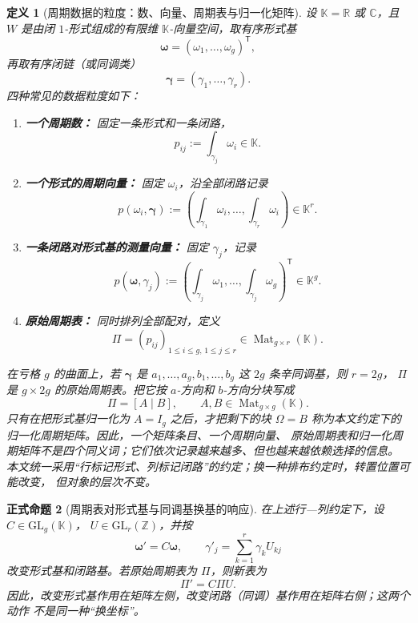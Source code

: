 \documentclass[UTF8,fontset=none,a4paper,11pt]{ctexart}
\theoremstyle{foundation-definition}
\newtheorem{definition}{定义}[section]
\theoremstyle{foundation-theorem}
\theoremstyle{foundation-proposition}
\newtheorem{proposition}[definition]{正式命题}
\theoremstyle{foundation-example}
\theoremstyle{foundation-remark}
\theoremstyle{foundation-theorem}
\begin{document}
\begin{definition}[周期数据的粒度：数、向量、周期表与归一化矩阵]\label{def:period-data-levels}
设 \(\mathbb K=\mathbb R\) 或 \(\mathbb C\)，且 \(W\) 是由闭 \(1\)-形式组成的有限维
\(\mathbb K\)-向量空间，取有序形式基
\[
  \boldsymbol\omega=(\omega_1,\ldots,\omega_g)^{\mathsf T},
\]
再取有序闭链（或同调类）
\[
  \boldsymbol\gamma=(\gamma_1,\ldots,\gamma_r).
\]
四种常见的数据粒度如下：
\begin{enumerate}[label=(\alph*)]
  \item \textbf{一个周期数：} 固定一条形式和一条闭路，
  \[
    p_{ij}:=\int_{\gamma_j}\omega_i\in\mathbb K.
  \]
  \item \textbf{一个形式的周期向量：} 固定 \(\omega_i\)，沿全部闭路记录
  \[
    p(\omega_i,\boldsymbol\gamma)
    :=\left(\int_{\gamma_1}\omega_i,\ldots,
    \int_{\gamma_r}\omega_i\right)\in\mathbb K^r.
  \]
  \item \textbf{一条闭路对形式基的测量向量：} 固定 \(\gamma_j\)，记录
  \[
    p(\boldsymbol\omega,\gamma_j)
    :=\left(\int_{\gamma_j}\omega_1,\ldots,
    \int_{\gamma_j}\omega_g\right)^{\mathsf T}\in\mathbb K^g.
  \]
  \item \textbf{原始周期表：} 同时排列全部配对，定义
  \[
    \Pi=(p_{ij})_{1\leq i\leq g,\,1\leq j\leq r}
    \in\operatorname{Mat}_{g\times r}(\mathbb K).
  \]
\end{enumerate}
在亏格 \(g\) 的曲面上，若 \(\boldsymbol\gamma\) 是
\(a_1,\ldots,a_g,b_1,\ldots,b_g\) 这 \(2g\) 条辛同调基，则 \(r=2g\)，
\(\Pi\) 是 \(g\times2g\) 的原始周期表。把它按 \(a\)-方向和 \(b\)-方向分块写成
\[
  \Pi=[A\mid B],\qquad A,B\in\operatorname{Mat}_{g\times g}(\mathbb K).
\]
只有在把形式基归一化为 \(A=I_g\) 之后，才把剩下的块
\(\Omega=B\) 称为本文约定下的归一化周期矩阵。因此，一个矩阵条目、一个周期向量、
原始周期表和归一化周期矩阵不是四个同义词；它们依次记录越来越多、但也越来越依赖选择的信息。
本文统一采用“行标记形式、列标记闭路”的约定；换一种排布约定时，转置位置可能改变，
但对象的层次不变。
\end{definition}

\begin{proposition}[周期表对形式基与同调基换基的响应]\label{prop:period-table-basis-change}
在上述行—列约定下，设 \(C\in\mathrm{GL}_g(\mathbb K)\)，
\(U\in\mathrm{GL}_r(\mathbb Z)\)，并按
\[
  \boldsymbol\omega'=C\boldsymbol\omega,
  \qquad
  \gamma'_j=\sum_{k=1}^r\gamma_kU_{kj}
\]
改变形式基和闭路基。若原始周期表为 \(\Pi\)，则新表为
\[
  \Pi'=C\Pi U.
\]
因此，改变形式基作用在矩阵左侧，改变闭路（同调）基作用在矩阵右侧；这两个动作
不是同一种“换坐标”。
\end{proposition}
\end{document}
